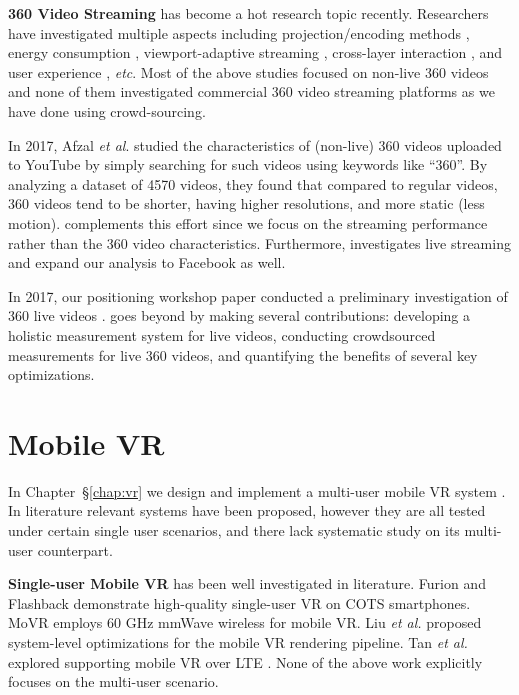 \textbf{360\degree{} Video Streaming} has become a hot research topic recently.
Researchers have investigated multiple aspects including projection/encoding methods \cite{kuzyakov2016next,kuzyakov2015under,lee2016rich360,nasrabadi2017adaptive,zhou2017measurement}, energy consumption \cite{jiang2017power},
viewport-adaptive streaming \cite{almquist2018prefetch,bao2016shooting,corbillon2017optimal,corbillon2017viewport,graf2017towards,petrangeli2017http,qian2016optimizing,qian2018flare,xiao2017optile,xie2017360probdash,xie2018cls},
cross-layer interaction \cite{sun2018multi,xie2017poi360}, and user experience \cite{broeck2017s}, \emph{etc}. Most
of the above studies focused on non-live 360\degree{} videos and none of
them investigated commercial 360\degree{} video streaming platforms as
we have done using crowd-sourcing.

In 2017, Afzal \emph{et al}. \cite{afzal2017characterization} studied the characteristics of (non-live)
360\degree{} videos uploaded to YouTube by simply searching for such
videos using keywords like ``360''. By analyzing a dataset of 4570
videos, they found that compared to regular videos, 360\degree{} videos
tend to be shorter, having higher resolutions, and more static (less
motion). \lime complements this effort since we focus on the
streaming performance rather than the 360\degree{} video characteristics. Furthermore, \lime investigates live streaming and expand our analysis
to Facebook as well.

In 2017, our positioning workshop paper
conducted a preliminary investigation of 360\degree{} live videos \cite{liu2017360}. \lime goes beyond \cite{liu2017360} by making several contributions: developing
a holistic measurement system for live videos, conducting crowdsourced
measurements for live 360\degree{} videos, and quantifying the
benefits of several key optimizations.

\section{Mobile VR}
In Chapter~\S\ref{chap:vr} we design and implement a multi-user mobile VR system \firefly. In literature relevant systems have been proposed, however they are all tested under certain single user scenarios, and there lack systematic study on its
multi-user counterpart.

\textbf{Single-user Mobile VR} has been well investigated in literature.
Furion \cite{lai2019furion} and Flashback \cite{boos2016flashback} demonstrate
high-quality single-user VR on COTS smartphones.
MoVR \cite{abari2016cutting,abari2017enabling} employs 60 GHz mmWave wireless for mobile
VR. Liu \emph{et al.} \cite{liu2018cutting} proposed system-level optimizations
for the mobile VR rendering pipeline. Tan \emph{et al.} explored supporting
mobile VR over LTE \cite{tan2018vr}. None of the above work
explicitly focuses on the multi-user scenario.

